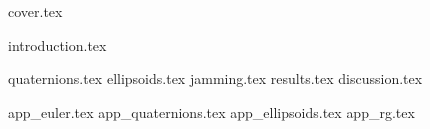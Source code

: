 \documentclass[a4paper]{report}
\begin{document}
{cover.tex}

\tableofcontents
\thispagestyle{empty}
\newpage
\setcounter{page}{1}

{introduction.tex}

{quaternions.tex}
{ellipsoids.tex}
{jamming.tex}
{results.tex}
{discussion.tex}

\newpage
{}

{\renewcommand{\bibname}{References}}

\begin{appendices}

{app_euler.tex}
{app_quaternions.tex}
{app_ellipsoids.tex}
{app_rg.tex}

\end{appendices}
\end{document}
